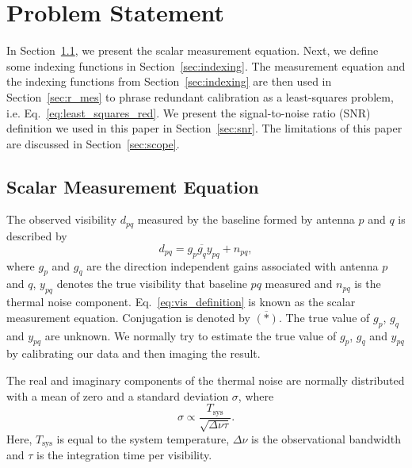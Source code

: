 \documentclass[useAMS,usenatbib]{mn2e}
\newcommand{\conj}[1]{\overline{#1}}
\begin{document}
\section{Problem Statement}
\label{sec:p_statement}
In Section~\ref{sec:s_mes}, we present the scalar measurement equation. Next, we define some indexing functions in Section~\ref{sec:indexing}. The measurement 
equation and the indexing functions from Section~\ref{sec:indexing} are then used in Section~\ref{sec:r_mes} to phrase redundant calibration as a least-squares problem, i.e. Eq.~\eqref{eq:least_squares_red}.
We present the signal-to-noise ratio (SNR) definition we used in this paper in Section~\ref{sec:snr}. The limitations of this paper are discussed in Section~\ref{sec:scope}.

\subsection{Scalar Measurement Equation}
\label{sec:s_mes}
The observed visibility $d_{pq}$ measured by the baseline formed by antenna $p$ and $q$ is described by
\begin{equation}
\label{eq:vis_definition}
d_{pq} = g_{p}\conj{g_q}y_{pq} + n_{pq},
\end{equation}
where $g_{p}$ and $g_{q}$ are the direction independent gains associated with antenna $p$ and $q$, $y_{pq}$ denotes the true visibility that baseline $pq$ measured
and $n_{pq}$ is the thermal noise component. Eq.~\eqref{eq:vis_definition} is known as the scalar measurement equation. Conjugation is denoted by $\conj{(*)}$. The true value of $g_p$, $g_q$ and $y_{pq}$ are unknown. We normally try to estimate the true value of
$g_p$, $g_q$ and $y_{pq}$ by calibrating our data and then imaging the result.

The real and imaginary components of the thermal noise are normally distributed with a mean of zero and a standard deviation $\sigma$, where   
\begin{equation}
\sigma \propto \frac{T_{\textrm{sys}}}{\sqrt{\Delta \nu \tau}}. 
\end{equation}
Here, $T_{\textrm{sys}}$ is equal to the system temperature, $\Delta \nu$ is the observational bandwidth and $\tau$ is the integration time per visibility. 
\end{document}
